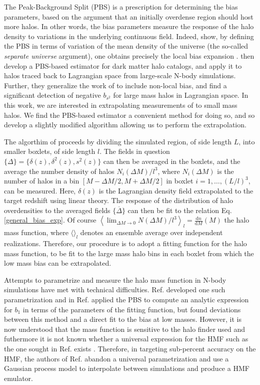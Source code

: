 The Peak-Background Split (PBS) is a prescription for determining the bias parameters, based on the argument that an initially overdense region should host more halos. In other words, the bias parameters measure the response of the halo density to variations in the underlying continuous field. Indeed, \citeauthor{schmidt2013} show, by defining the PBS in terms of variation of the mean density of the universe (the so-called \textit{separate universe} argument), one obtains precisely the local bias expansion \citep{biasreview}. \citeauthor{modietal2017} then develop a PBS-based estimator for dark matter halo catalogs, and apply it to halos traced back to Lagrangian space from large-scale N-body simulations. Further, they generalize the work of \citeauthor{schmidt2013} to include non-local bias, and find a significant detection of negative $b_{s^2}$ for large mass halos in Lagrangian space. In this work, we are interested in extrapolating measurements of  \citeauthor{modietal2017} to small mass halos. We find the PBS-based estimator a convenient method for doing so, and so develop a slightly modified algorithm allowing us to perform the extrapolation. 

The algorthim of \citeauthor{modietal2017} proceeds by dividing the simulated region, of side length $L$, into smaller boxlets, of side length $l$. The fields in question $\{\Delta\} = \{\delta(z), \delta^2(z), s^2(z)\}$ can then be averaged in the boxlets, and the average the number density of halos $N_i(\Delta M)/l^3$, where $N_i(\Delta M)$ is the number of halos in a bin $[M - \Delta M/2, M + \Delta M/2]$ in boxlet $i = 1, \dots, (L/l)^3$, can be measured. Here, $\delta(z)$ is the Lagrangian density field extrapolated to the target redshift using linear theory. The response of the distribution of halo overdensities to the averaged fields $\{\overline{\Delta}\}$ can then be fit to the relation Eq. \ref{general_bias_exp}. Of course $\left\langle \lim_{\Delta M \rightarrow 0} N(\Delta M)/l^3 \right\rangle_l = \frac{\mathrm{d}n}{\mathrm{d}M}(M)$ the halo mass function, where $\langle \rangle_l$ denotes an ensemble average over independent realizations. Therefore, our procedure is to adopt a fitting function for the halo mass function, to be fit to the large mass halo bins in each boxlet from which the low mass bias can be extrapolated.

Attempts to parametrize and measure the halo mass function in N-body simulations have met with technical difficulties. Ref. \citep{tinker2008} developed one such parametrization and in Ref. \citep{tinker2010} applied the PBS to compute an analytic expression for $b_1$ in terms of the parameters of the fitting function, but found deviations between this method and a direct fit to the bias at low masses. However, it is now understood that the mass function is sensitive to the halo finder used and futhermore it is not known whether a universal expression for the HMF such as the one sought in Ref. \citep{tinker2008} exists \citep{desjacquesetal2018}. Therefore, in targeting sub-percent accuracy on the HMF, the authors of Ref. \citep{aemulushmf} abandon a universal parametrization and use a Gaussian process model to interpolate between simulations and produce a HMF emulator.

